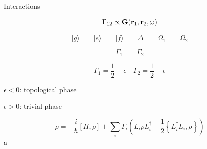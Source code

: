 \documentclass{article}
\begin{document}
Interactions

\begin{equation}
  \Gamma_{12} \propto \mathbf{G}({\bf r}_1, {\bf r}_2,
  \omega)
\end{equation}


\[|g\rangle\qquad|e\rangle\qquad|f\rangle\qquad\Delta\qquad\Omega_1\qquad\Omega_2\]

\[\Gamma_1 \qquad \Gamma_2\]

\[\Gamma_1 = \frac{1}{2}+\epsilon\quad\Gamma_2 = \frac{1}{2}-\epsilon\]

$\epsilon<0$: topological phase

$\epsilon>0$: trivial phase

\begin{equation}
  \dot{\rho} = -\frac{i}{\hbar}[H, \rho] + \sum_i \Gamma_i \left( L_i
  \rho L_i^\dagger -\frac{1}{2}\left\{ L_i^\dagger L_i, \rho \right\}\right)
\end{equation}
a
\end{document}
